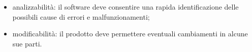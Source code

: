 \begin{itemize}
    \item analizzabilità: il software deve consentire una rapida identificazione delle possibili cause di errori e malfunzionamenti;
    \item modificabilità: il prodotto deve permettere eventuali cambiamenti in alcune sue parti.
\end{itemize}